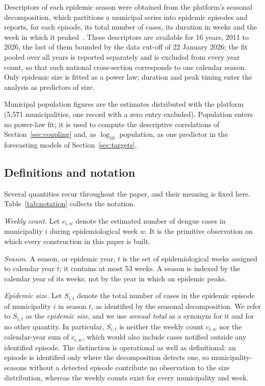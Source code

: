 \documentclass[english,10pt,b5paper]{article}
\begin{document}
Descriptors of each epidemic season were obtained from the platform's seasonal
decomposition, which partitions a municipal series into epidemic episodes and
reports, for each episode, its total number of cases, its duration in weeks
and the week in which it peaked~\citep{araujo2025large}. These descriptors are
available for 16 years, 2011 to 2026, the last of them bounded by the data
cut-off of 22 January 2026; the fit pooled over all years is reported
separately and is excluded from every year count, so that each national
cross-section corresponds to one calendar season. Only epidemic size is fitted
as a power law; duration and peak timing enter the analysis as predictors of
size.

Municipal population figures are the estimates distributed with the platform
(5{,}571 municipalities, one record with a zero entry excluded). Population
enters no power-law fit; it is used to compute the descriptive correlations of
Section~\ref{sec:coupling} and, as $\log_{10}$ population, as one predictor in
the forecasting models of Section~\ref{sec:targets}.

\subsection{Definitions and notation}
\label{sec:definitions}

Several quantities recur throughout the paper, and their meaning is fixed
here. Table~\ref{tab:notation} collects the notation.

\emph{Weekly count.} Let $c_{i,w}$ denote the estimated number of dengue cases
in municipality $i$ during epidemiological week $w$. It is the primitive
observation on which every construction in this paper is built.

\emph{Season.} A season, or epidemic year, $t$ is the set of epidemiological
weeks assigned to calendar year $t$; it contains at most 53 weeks. A season is
indexed by the calendar year of its weeks, not by the year in which an epidemic
peaks.

\emph{Epidemic size.} Let $S_{i,t}$ denote the total number of cases in the
epidemic episode of municipality $i$ in season $t$, as identified by the seasonal
decomposition. We refer to $S_{i,t}$ as the \emph{epidemic size}, and we use
\emph{annual total} as a synonym for it and for no other quantity. In particular,
$S_{i,t}$ is neither the weekly count $c_{i,w}$ nor the calendar-year sum of
$c_{i,w}$, which would also include cases notified outside any identified
episode. The distinction is operational as well as definitional: an episode is
identified only where the decomposition detects one, so municipality-seasons
without a detected episode contribute no observation to the size distribution,
whereas the weekly counts exist for every municipality and week.
\end{document}
